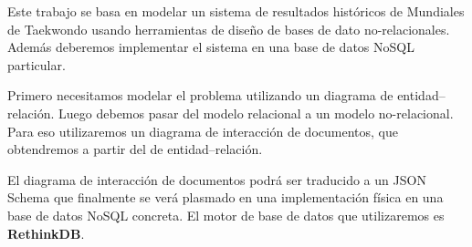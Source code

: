 Este trabajo se basa en modelar un sistema de resultados históricos de Mundiales de Taekwondo usando herramientas de diseño de bases de dato no-relacionales. Además deberemos implementar el sistema en una base de datos NoSQL particular.

Primero necesitamos modelar el problema utilizando un diagrama de entidad--relación. Luego debemos pasar del modelo relacional a un modelo no-relacional. Para eso utilizaremos un diagrama de interacción de documentos, que obtendremos a partir del de entidad--relación.

El diagrama de interacción de documentos podrá ser traducido a un JSON Schema que finalmente se verá plasmado en una implementación física en una base de datos NoSQL concreta.
El motor de base de datos que utilizaremos es \textbf{RethinkDB}.

